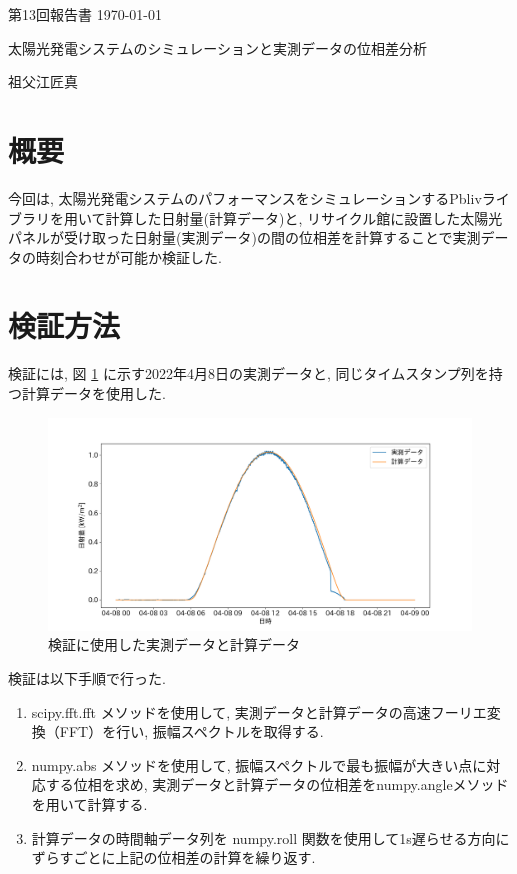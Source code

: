\documentclass[a4j,12pt,]{jarticle}
\begin{document}
{\noindent\small 第13回報告書 \hfill\today}
\begin{center}
  {\Large 太陽光発電システムのシミュレーションと実測データの位相差分析}
\end{center}
\begin{flushright}
  祖父江匠真 \\
\end{flushright}

\section{概要}
今回は, 太陽光発電システムのパフォーマンスをシミュレーションするPblivライブラリを用いて計算した日射量(計算データ)と, リサイクル館に設置した太陽光パネルが受け取った日射量(実測データ)の間の位相差を計算することで実測データの時刻合わせが可能か検証した.

\section{検証方法}
検証には, 図 \ref{p1} に示す2022年4月8日の実測データと, 同じタイムスタンプ列を持つ計算データを使用した.

\begin{figure}[H]
  \begin{center}
    \includegraphics[width=160mm]{real_and_calced.png}
    \caption{検証に使用した実測データと計算データ}
    \label{p1}
  \end{center}
\end{figure}

検証は以下手順で行った.

\begin{enumerate}
  \item scipy.fft.fft メソッドを使用して, 実測データと計算データの高速フーリエ変換（FFT）を行い, 振幅スペクトルを取得する.  
  \item numpy.abs メソッドを使用して, 振幅スペクトルで最も振幅が大きい点に対応する位相を求め, 実測データと計算データの位相差をnumpy.angleメソッドを用いて計算する. 
  \item 計算データの時間軸データ列を numpy.roll 関数を使用して1s遅らせる方向にずらすごとに上記の位相差の計算を繰り返す. 
\end{enumerate}
\end{document}
